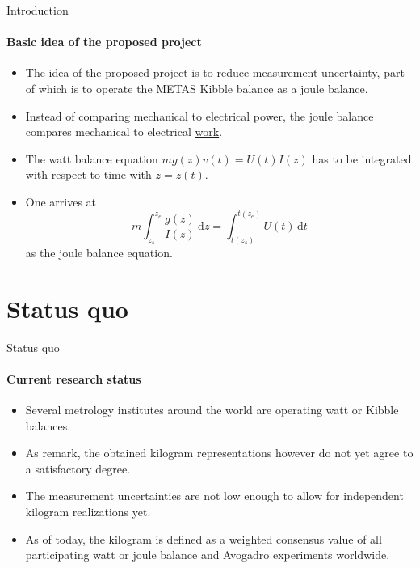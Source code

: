 \documentclass{beamer}
\begin{document}
\begin{frame}[allowframebreaks]{Introduction}
\framesubtitle{Basic idea of the proposed project}
\begin{itemize}
    \item The idea of the proposed project is to reduce measurement uncertainty, part of which is to operate the METAS Kibble balance as a joule balance.
    \item Instead of comparing mechanical to electrical power, the joule balance compares mechanical to electrical \underline{work}.
    \item The watt balance equation $mg(z)v(t) = U(t)I(z)$ has to be integrated with respect to time with $z=z(t)$.
    \item One arrives at \begin{equation}
        m\int_{z_s}^{z_e}\frac{g(z)}{I(z)}\,\mathrm{d}z = \int_{t(z_s)}^{t(z_e)}U(t)\,\mathrm{d}t
    \end{equation} as the joule balance equation.
\end{itemize}
\end{frame}


\section{Status quo}
\begin{frame}[allowframebreaks]{Status quo}
\framesubtitle{Current research status}
\begin{itemize}
\item Several metrology institutes around the world are operating watt or Kibble balances.
\item As \cite{Stock_2023} remark, the obtained kilogram representations however do not yet agree to a satisfactory degree.
\item The measurement uncertainties are not low enough to allow for independent kilogram realizations yet.
\item As of today, the kilogram is defined as a weighted consensus value of all participating watt or joule balance and Avogadro experiments worldwide.
\end{itemize}
\end{frame}
\end{document}
